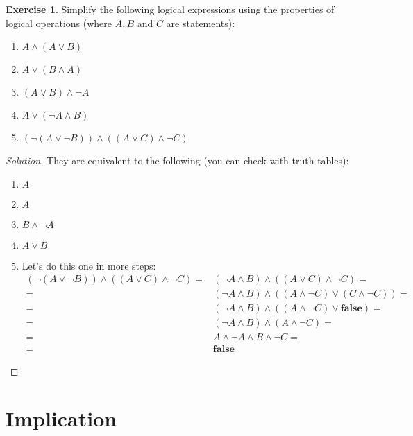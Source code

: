 \documentclass[a4paper,oneside]{article}
\theoremstyle{definition} \newtheorem{exercise}{Exercise}[section]
\begin{document}
\begin{exercise}
  Simplify the following logical expressions using the properties of logical
  operations (where $A,B$ and $C$ are statements):
  \begin{enumerate}
    \item $A\land(A\lor B)$
    \item $A\lor (B\land A)$
    \item $(A\lor B) \land \neg A$
    \item $A \lor (\neg A\land B)$
    \item $(\neg (A\lor \neg B))\land ((A\lor C) \land \neg C)$
  \end{enumerate}
\end{exercise}
\begin{proof}[Solution]
  They are equivalent to the following (you can check with truth tables):
  \begin{enumerate}
    \item $A$
    \item $A$
    \item $B\land \neg A$
    \item $A\lor B$
    \item Let's do this one in more steps:
      \begin{align*}
        (\neg (A\lor \neg B))\land ((A\lor C) \land \neg C)=
        &(\neg A\land B)\land ((A\lor C)\land \neg C)=\\
        =&(\neg A\land B)\land ((A\land \neg C)\lor (C\land \neg C))=\\
        =&(\neg A\land B)\land ((A\land \neg C)\lor \textbf{false})=\\
        =&(\neg A\land B)\land (A\land \neg C)=\\
        =&A\land \neg A\land B\land \neg C=\\
        =&\textbf{false}
      \end{align*}
  \end{enumerate}
\end{proof}

\section{Implication}
\end{document}
